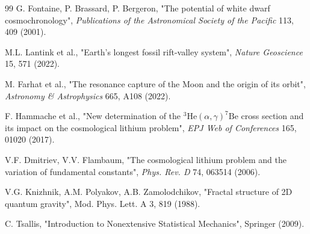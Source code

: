 \documentclass[12pt,a4paper]{article}
\theoremstyle{remark}
\begin{document}
\begin{thebibliography}{99}
		G. Fontaine, P. Brassard, P. Bergeron, "The potential of white dwarf cosmochronology", \emph{Publications of the Astronomical Society of the Pacific} 113, 409 (2001).
		
		M.L. Lantink et al., "Earth's longest fossil rift-valley system", \emph{Nature Geoscience} 15, 571 (2022).
		
		M. Farhat et al., "The resonance capture of the Moon and the origin of its orbit", \emph{Astronomy \& Astrophysics} 665, A108 (2022).
		
		F. Hammache et al., "New determination of the \(^3\mathrm{He}(\alpha,\gamma)^7\mathrm{Be}\) cross section and its impact on the cosmological lithium problem", \emph{EPJ Web of Conferences} 165, 01020 (2017).
		
		V.F. Dmitriev, V.V. Flambaum, "The cosmological lithium problem and the variation of fundamental constants", \emph{Phys. Rev. D} 74, 063514 (2006).
		
		V.G. Knizhnik, A.M. Polyakov, A.B. Zamolodchikov, "Fractal structure of 2D quantum gravity", Mod. Phys. Lett. A 3, 819 (1988).
		
		C. Tsallis, "Introduction to Nonextensive Statistical Mechanics", Springer (2009).
		
	\end{thebibliography}
	
\end{document}

